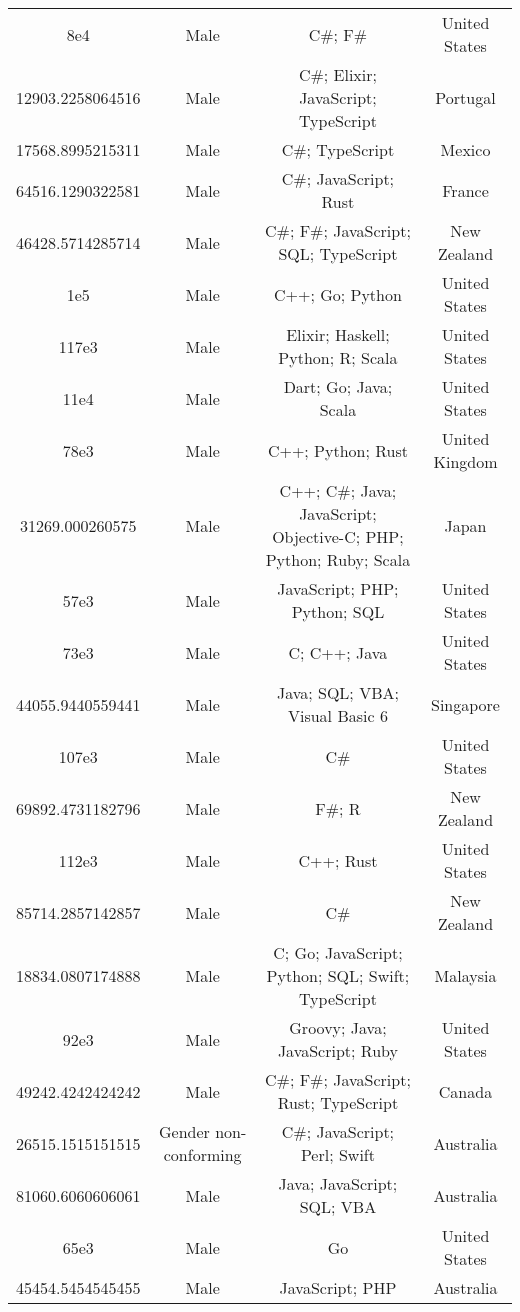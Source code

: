 \begin{center}
\begin{tabular}{ |c|c|c|c| }
8e4  &  Male  &  C\#; F\#  &  United States  \\ 
12903.2258064516  &  Male  &  C\#; Elixir; JavaScript; TypeScript  &  Portugal  \\ 
17568.8995215311  &  Male  &  C\#; TypeScript  &  Mexico  \\ 
64516.1290322581  &  Male  &  C\#; JavaScript; Rust  &  France  \\ 
46428.5714285714  &  Male  &  C\#; F\#; JavaScript; SQL; TypeScript  &  New Zealand  \\ 
1e5  &  Male  &  C++; Go; Python  &  United States  \\ 
117e3  &  Male  &  Elixir; Haskell; Python; R; Scala  &  United States  \\ 
11e4  &  Male  &  Dart; Go; Java; Scala  &  United States  \\ 
78e3  &  Male  &  C++; Python; Rust  &  United Kingdom  \\ 
31269.000260575  &  Male  &  C++; C\#; Java; JavaScript; Objective-C; PHP; Python; Ruby; Scala  &  Japan  \\ 
57e3  &  Male  &  JavaScript; PHP; Python; SQL  &  United States  \\ 
73e3  &  Male  &  C; C++; Java  &  United States  \\ 
44055.9440559441  &  Male  &  Java; SQL; VBA; Visual Basic 6  &  Singapore  \\ 
107e3  &  Male  &  C\#  &  United States  \\ 
69892.4731182796  &  Male  &  F\#; R  &  New Zealand  \\ 
112e3  &  Male  &  C++; Rust  &  United States  \\ 
85714.2857142857  &  Male  &  C\#  &  New Zealand  \\ 
18834.0807174888  &  Male  &  C; Go; JavaScript; Python; SQL; Swift; TypeScript  &  Malaysia  \\ 
92e3  &  Male  &  Groovy; Java; JavaScript; Ruby  &  United States  \\ 
49242.4242424242  &  Male  &  C\#; F\#; JavaScript; Rust; TypeScript  &  Canada  \\ 
26515.1515151515  &  Gender non-conforming  &  C\#; JavaScript; Perl; Swift  &  Australia  \\ 
81060.6060606061  &  Male  &  Java; JavaScript; SQL; VBA  &  Australia  \\ 
65e3  &  Male  &  Go  &  United States  \\ 
45454.5454545455  &  Male  &  JavaScript; PHP  &  Australia  \\ 

\end{tabular}
\end{center}

